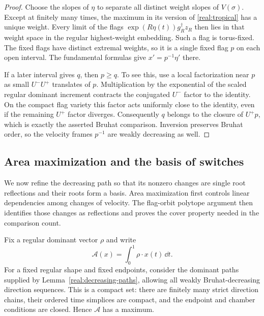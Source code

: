\begin{proof}
Choose the slopes of $\eta$ to separate all distinct weight slopes
of $V(\sigma)$.  Except at finitely many times, the maximum in its
version of \eqref{real:tropical} has a unique weight.  Every limit
of the flags $\exp(R\eta(t))g_R^\dagger z_R$ then lies in that
weight space in the regular highest-weight embedding.  Such a flag
is torus-fixed.  The fixed flags have distinct extremal weights,
so it is a single fixed flag $p$ on each open interval.  The
fundamental formulas give $x'=p^{-1}\eta'$ there.

If a later interval gives $q$, then $p\ge q$.  To see this, use a
local factorization near $p$ as small $U^-U^+$ translates of $p$.
Multiplication by the exponential of the scaled regular dominant
increment contracts the conjugated $U^-$ factor to the identity.
On the compact flag variety this factor acts uniformly close to the
identity, even if the remaining $U^+$ factor diverges.
Consequently $q$ belongs to the closure of $U^+p$, which is exactly
the asserted Bruhat comparison.  Inversion preserves Bruhat order,
so the velocity frames $p^{-1}$ are weakly decreasing as well.
\end{proof}

\subsection{Area maximization and the basis of switches}

We now refine the decreasing path so that its nonzero changes are
single root reflections and their roots form a basis. Area maximization
first controls linear dependencies among changes of velocity. The
flag-orbit polytope argument then identifies those changes as reflections
and proves the cover property needed in the comparison count.

Fix a regular dominant vector $\rho$ and write
\[
 \mathcal A(x)=\int_0^1\rho\cdot x(t)\,\dd t.
\]
For a fixed regular shape and fixed endpoints, consider the dominant
paths supplied by Lemma~\ref{real:decreasing-paths}, allowing all
weakly Bruhat-decreasing direction sequences.  This is a compact
set: there are finitely many strict direction chains, their ordered
time simplices are compact, and the endpoint and chamber conditions
are closed.  Hence $\mathcal A$ has a maximum.

